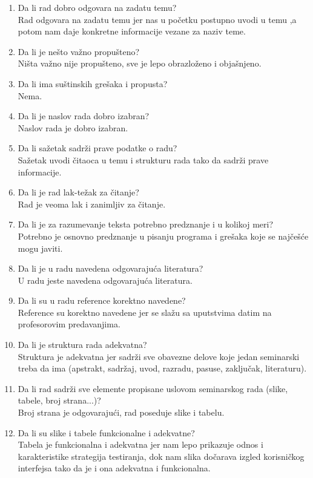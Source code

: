 \documentclass[a4paper]{report}
\begin{document}
\begin{enumerate}
\item Da li rad dobro odgovara na zadatu temu?\\
Rad odgovara na zadatu temu jer nas u početku postupno uvodi u temu ,a potom nam daje konkretne informacije vezane za naziv teme. 
\item Da li je nešto važno propušteno?\\
Ništa važno nije propušteno, sve je lepo obrazloženo i objašnjeno. 
\item Da li ima suštinskih grešaka i propusta?\\
Nema.
\item Da li je naslov rada dobro izabran?\\
Naslov rada je dobro izabran.
\item Da li sažetak sadrži prave podatke o radu?\\
Sažetak uvodi čitaoca u temu i strukturu rada tako da sadrži prave informacije.
\item Da li je rad lak-težak za čitanje?\\
Rad je veoma lak i zanimljiv za čitanje.
\item Da li je za razumevanje teksta potrebno predznanje i u kolikoj meri?\\
Potrebno je osnovno predznanje u pisanju programa i grešaka koje se najčešće mogu javiti.
\item Da li je u radu navedena odgovarajuća literatura?\\
U radu jeste navedena odgovarajuća literatura.
\item Da li su u radu reference korektno navedene?\\
Reference su korektno navedene jer se slažu sa uputstvima datim na profesorovim predavanjima.
\item Da li je struktura rada adekvatna?\\
Struktura je adekvatna jer sadrži sve obavezne delove koje jedan seminarski treba da ima (apstrakt, sadržaj, uvod, razradu, pasuse, zaključak, literaturu).
\item Da li rad sadrži sve elemente propisane uslovom seminarskog rada (slike, tabele, broj strana...)?\\
Broj strana je odgovarajući, rad poseduje slike i tabelu.
\item Da li su slike i tabele funkcionalne i adekvatne?\\
Tabela je funkcionalna i adekvatna jer nam lepo prikazuje odnos i karakteristike strategija testiranja, dok nam slika dočarava izgled korisničkog interfejsa tako da je i ona adekvatna i funkcionalna.
\end{enumerate}
\end{document}
